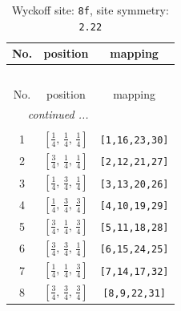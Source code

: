 \documentclass[fleqn,8pt]{jsarticle}
\begin{document}
\begin{longtable}{ccc}
\caption{Wyckoff site: {\tt 8f}, site symmetry: {\tt 2.22}}
 \\
 \hline \hline
No. & position & mapping \\ \hline \endfirsthead

\multicolumn{2}{l}{\tablename\ \thetable{}} \\
 \hline \hline
No. & position & mapping \\ \hline \endhead

 \hline \hline
\multicolumn{2}{r}{\footnotesize\it continued ...} \\ \endfoot

 \hline \hline
\multicolumn{2}{r}{} \\ \endlastfoot

1 & $\left[ \frac{1}{4},\, \frac{1}{4},\, \frac{1}{4} \right]$ & {\tt [1,16,23,30]} \\ \hline
2 & $\left[ \frac{3}{4},\, \frac{1}{4},\, \frac{1}{4} \right]$ & {\tt [2,12,21,27]} \\ \hline
3 & $\left[ \frac{1}{4},\, \frac{3}{4},\, \frac{1}{4} \right]$ & {\tt [3,13,20,26]} \\ \hline
4 & $\left[ \frac{1}{4},\, \frac{3}{4},\, \frac{3}{4} \right]$ & {\tt [4,10,19,29]} \\ \hline
5 & $\left[ \frac{3}{4},\, \frac{1}{4},\, \frac{3}{4} \right]$ & {\tt [5,11,18,28]} \\ \hline
6 & $\left[ \frac{3}{4},\, \frac{3}{4},\, \frac{1}{4} \right]$ & {\tt [6,15,24,25]} \\ \hline
7 & $\left[ \frac{1}{4},\, \frac{1}{4},\, \frac{3}{4} \right]$ & {\tt [7,14,17,32]} \\ \hline
8 & $\left[ \frac{3}{4},\, \frac{3}{4},\, \frac{3}{4} \right]$ & {\tt [8,9,22,31]} \\
\end{longtable}
\renewcommand{\arraystretch}{1.2}
\end{document}
